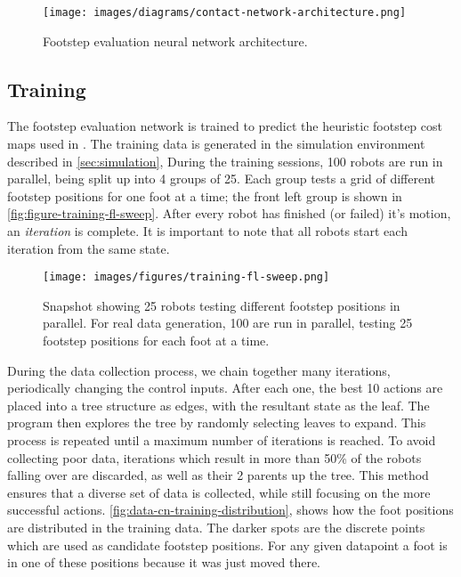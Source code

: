 \begin{figure}[H]
  \centering
  \texttt{[image: images/diagrams/contact-network-architecture.png]}
  \caption{Footstep evaluation neural network architecture.}
  \label{fig:diagram-contactnet-architecture}
\end{figure}


\subsection{Training}

The footstep evaluation network is trained to predict the heuristic
footstep cost maps used in \cite{bratta_contactnet_2024}. The training
data is generated in the simulation environment described in
\autoref{sec:simulation},
During the training sessions, 100 robots are run in parallel, being split
up into 4 groups of 25. Each group tests a grid of different footstep
positions for one foot at a time; the front left group is shown in
\autoref{fig:figure-training-fl-sweep}.
After every robot has finished (or failed) it's motion, an
\textit{iteration} is complete.
It is important to note that all robots start each iteration from the
same state.

\begin{figure}[H]
  \centering
  \texttt{[image: images/figures/training-fl-sweep.png]}
  \caption{Snapshot showing 25 robots testing different footstep
    positions in parallel. For real data generation, 100 are run in
  parallel, testing 25 footstep positions for each foot at a time.}
  \label{fig:figure-training-fl-sweep}
\end{figure}

During the data collection process, we chain together many
iterations, periodically
changing the control inputs. After each one,
the best 10 actions are placed into a tree structure as edges, with
the resultant
state as the leaf. The program then explores the tree by randomly selecting
leaves to expand. This process is repeated until a maximum number of
iterations is reached.
To avoid collecting poor data, iterations which result in more than
50\% of the robots falling
over are discarded, as well as their 2 parents up the tree. This
method ensures that a diverse
set of data is collected, while still focusing on the more successful
actions. \autoref{fig:data-cn-training-distribution}, shows
how the foot positions are distributed in the training data.
The darker spots are the discrete points which are used as candidate
footstep positions. For any given datapoint a foot is in one of these
positions because it was just moved there.

